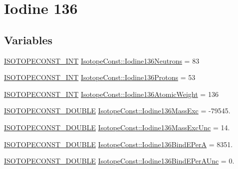 \hypertarget{group___isotope_const-_iodine-_i136}{}\section{Iodine 136}
\label{group___isotope_const-_iodine-_i136}
\subsection*{Variables}
\begin{DoxyCompactItemize}
\item 
\mbox{\hyperlink{group___isotope_const-_macros_ga5f18360b3e99483a35c32d789e62621c}{I\+S\+O\+T\+O\+P\+E\+C\+O\+N\+S\+T\+\_\+\+I\+NT}} \mbox{\hyperlink{group___isotope_const-_iodine-_i136_ga8f78da96f36129e04dfcead9c6633e9c}{Isotope\+Const\+::\+Iodine136\+Neutrons}} = 83
\item 
\mbox{\hyperlink{group___isotope_const-_macros_ga5f18360b3e99483a35c32d789e62621c}{I\+S\+O\+T\+O\+P\+E\+C\+O\+N\+S\+T\+\_\+\+I\+NT}} \mbox{\hyperlink{group___isotope_const-_iodine-_i136_gada7093d15bdf8ea56ef7735583c23e11}{Isotope\+Const\+::\+Iodine136\+Protons}} = 53
\item 
\mbox{\hyperlink{group___isotope_const-_macros_ga5f18360b3e99483a35c32d789e62621c}{I\+S\+O\+T\+O\+P\+E\+C\+O\+N\+S\+T\+\_\+\+I\+NT}} \mbox{\hyperlink{group___isotope_const-_iodine-_i136_gabcdb23ad459dc9e3e68d11b949e44e07}{Isotope\+Const\+::\+Iodine136\+Atomic\+Weight}} = 136
\item 
\mbox{\hyperlink{group___isotope_const-_macros_ga8f45a7272ce02c0b4c65c44636ed719a}{I\+S\+O\+T\+O\+P\+E\+C\+O\+N\+S\+T\+\_\+\+D\+O\+U\+B\+LE}} \mbox{\hyperlink{group___isotope_const-_iodine-_i136_ga6297d392ffa6f41be1771e369709e551}{Isotope\+Const\+::\+Iodine136\+Mass\+Exc}} = -\/79545.
\item 
\mbox{\hyperlink{group___isotope_const-_macros_ga8f45a7272ce02c0b4c65c44636ed719a}{I\+S\+O\+T\+O\+P\+E\+C\+O\+N\+S\+T\+\_\+\+D\+O\+U\+B\+LE}} \mbox{\hyperlink{group___isotope_const-_iodine-_i136_ga301d9da725e2fa49a3add2910e049424}{Isotope\+Const\+::\+Iodine136\+Mass\+Exc\+Unc}} = 14.
\item 
\mbox{\hyperlink{group___isotope_const-_macros_ga8f45a7272ce02c0b4c65c44636ed719a}{I\+S\+O\+T\+O\+P\+E\+C\+O\+N\+S\+T\+\_\+\+D\+O\+U\+B\+LE}} \mbox{\hyperlink{group___isotope_const-_iodine-_i136_gabefd4d97fd0b3dfc9a6a025307caaf60}{Isotope\+Const\+::\+Iodine136\+Bind\+E\+PerA}} = 8351.
\item 
\mbox{\hyperlink{group___isotope_const-_macros_ga8f45a7272ce02c0b4c65c44636ed719a}{I\+S\+O\+T\+O\+P\+E\+C\+O\+N\+S\+T\+\_\+\+D\+O\+U\+B\+LE}} \mbox{\hyperlink{group___isotope_const-_iodine-_i136_ga5167780ceea58d8f403ed6caabb29008}{Isotope\+Const\+::\+Iodine136\+Bind\+E\+Per\+A\+Unc}} = 0.

\end{DoxyCompactItemize}
